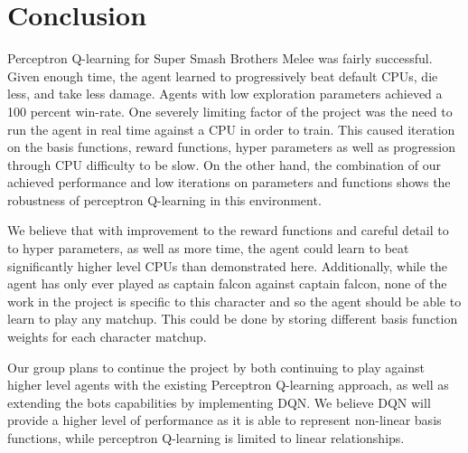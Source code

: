 \section{Conclusion}

Perceptron Q-learning for Super Smash Brothers Melee was fairly successful. Given enough time, the agent learned to progressively beat default CPUs, die less, and take less damage. Agents with low exploration parameters achieved a 100 percent win-rate. One severely limiting factor of the project was the need to run the agent in real time against a CPU in order to train. This caused iteration on the basis functions, reward functions, hyper parameters as well as progression through CPU difficulty to be slow. On the other hand, the combination of our achieved performance and low iterations on parameters and functions shows the robustness of perceptron Q-learning in this environment.

We believe that with improvement to the reward functions and careful detail to to hyper parameters, as well as more time, the agent could learn to beat significantly higher level CPUs than demonstrated here. Additionally, while the agent has only ever played as captain falcon against captain falcon, none of the work in the project is specific to this character and so the agent should be able to learn to play any matchup. This could be done by storing different basis function weights for each character matchup.

Our group plans to continue the project by both continuing to play against higher level agents with the existing Perceptron Q-learning approach, as well as extending the bots capabilities by implementing DQN. We believe DQN will provide a higher level of performance as it is able to represent non-linear basis functions, while perceptron Q-learning is limited to linear relationships.


